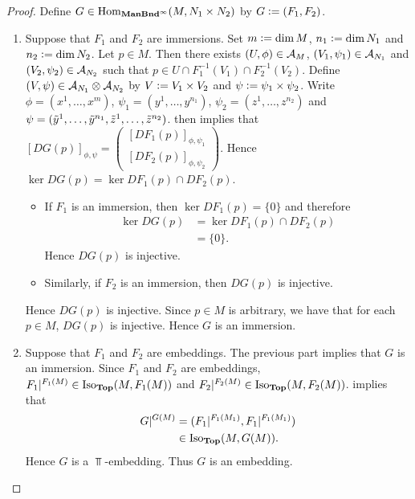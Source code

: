 \documentclass{book}
\begin{document}
\begin{proof}
	Define $G \in \operatorname{Hom}_{\operatorname*{\text{\textbf{ManBnd}}^{\infty}}}(M, N_1 \times N_2)$ by $G \vcentcolon= (F_1, F_2)$.
	\begin{enumerate}
		\item Suppose that $F_1$ and $F_2$ are immersions. Set $m \vcentcolon= \dim M$, $n_1 \vcentcolon= \dim N_1$ and $n_2 \vcentcolon= \dim N_2$. Let $p \in M$. Then there exists $(U, \phi) \in \mathcal{A}_M$, $(V_1, \psi_1) \in \mathcal{A}_{N_1}$ and $(V_2, \psi_2) \in \mathcal{A}_{N_2}$ such that $p \in U \cap F_1^{-1}(V_1) \cap F_2^{-1}(V_2)$. Define $(V, \psi) \in \mathcal{A}_{N_1} \otimes \mathcal{A}_{N_2}$ by $V \vcentcolon= V_1 \times V_2$ and $\psi \vcentcolon= \psi_1 \times \psi_2$. Write $\phi = (x^1, \ldots, x^m)$, $\psi_1 = (y^1, \ldots, y^{n_1})$, $\psi_2 = (z^1, \ldots, z^{n_2})$ and $\psi = (\tilde{y}^1, \ldots, \tilde{y}^{n_1}, \tilde{z}^1, \ldots, \tilde{z}^{n_2})$.  then implies that 
		$[DG(p)]_{\phi, \psi} = 
		\begin{pmatrix}
			[DF_1(p)]_{\phi, \psi_1} \\
			[DF_2(p)]_{\phi, \psi_2}
		\end{pmatrix}.$
		Hence $\ker DG(p) = \ker DF_1(p) \cap DF_2(p)$. 
		\begin{itemize}
			\item If $F_1$ is an immersion, then $\ker DF_1(p) = \{0\}$ and therefore
			\begin{align*}
				\ker DG(p) 
				& = \ker DF_1(p) \cap DF_2(p) \\
				& = \{0\}.
			\end{align*}
			Hence $DG(p)$ is injective. 
			\item Similarly, if $F_2$ is an immersion, then $DG(p)$ is injective.
		\end{itemize}
		Hence $DG(p)$ is injective. Since $p \in M$ is arbitrary, we have that for each $p \in M$, $DG(p)$ is injective. Hence $G$ is an immersion. 
		\item Suppose that $F_1$ and $F_2$ are embeddings. The previous part implies that $G$ is an immersion. Since $F_1$ and $F_2$ are embeddings, $F_1|^{F_1(M)} \in \operatorname{Iso}_{\operatorname*{\text{\textbf{Top}}}}(M, F_1(M))$ and $F_2|^{F_2(M)} \in \operatorname{Iso}_{\operatorname*{\text{\textbf{Top}}}}(M, F_2(M))$. \rex{}  implies that 
		\begin{align*}
			G|^{G(M)} 
			& = (F_1|^{F_1(M_1)}, F_1|^{F_1(M_1)}) \\
			& \in \operatorname{Iso}_{\operatorname*{\text{\textbf{Top}}}}( M, G(M)).
		\end{align*}
		Hence $G$ is a $\Top$-embedding. Thus $G$ is an embedding.
	\end{enumerate}
\end{proof}
\end{document}
